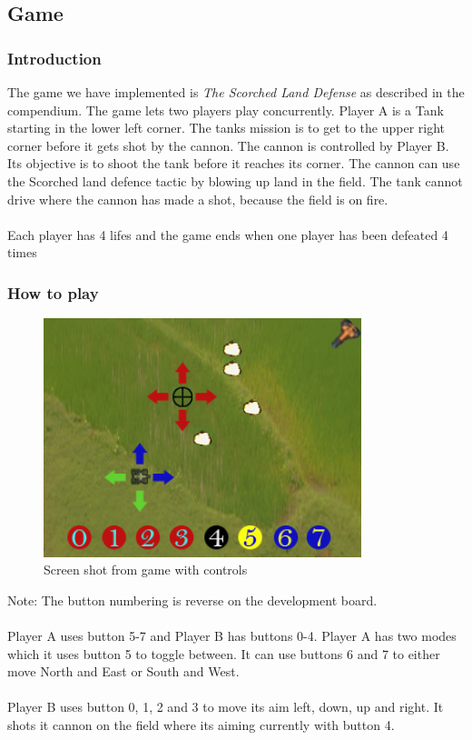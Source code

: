 \subsection{Game}

\subsubsection{Introduction}
The game we have implemented is {\it The Scorched Land Defense} as described in the compendium. The game lets
two players play concurrently. Player A is a Tank starting in the lower left corner. The tanks
mission is to get to the upper right corner before it gets shot by the cannon. The cannon is
controlled by Player B. Its objective is to shoot the tank before it reaches its corner. The cannon
can use the Scorched land defence tactic by blowing up land in the field. The tank cannot drive
where the cannon has made a shot, because the field is on fire.\\
\\
Each player has 4 lifes and the game ends when one player has been defeated 4 times

\subsubsection{How to play}
\begin{figure}[h]
  \includegraphics[width=350px]{graphics/buttons_illustration.jpg}
  \caption{Screen shot from game with controls}
\end{figure}
Note: The button numbering is reverse on the development board.\\
\\
Player A uses button 5-7 and Player B has buttons 0-4. Player A has two modes which it uses button 5
to toggle between. It can use buttons 6 and 7 to either move North and East or South and West.\\
\\
Player B uses button 0, 1, 2 and 3 to move its aim left, down, up and right. It shots it cannon on
the field where its aiming currently with button 4.
\newpage
